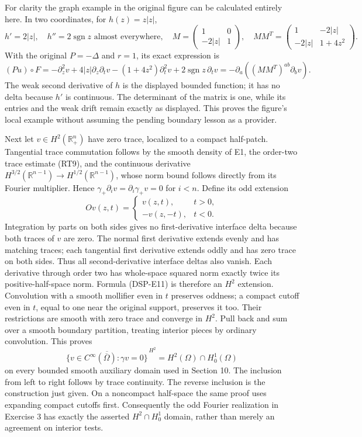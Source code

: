 \documentclass[
  11pt,
]{article}
\begin{document}
For clarity the graph example in the original figure can be calculated
entirely here. In two coordinates, for \(h(z)=z|z|\), \[
 h'=2|z|,\quad h''=2\operatorname{sgn}z\text{ almost everywhere},\quad
 M=\begin{pmatrix}1&0\\-2|z|&1\end{pmatrix},\quad
 MM^T=\begin{pmatrix}1&-2|z|\\-2|z|&1+4z^2\end{pmatrix}.
 \tag{DSP-E9}
\] With the original \(P=-\Delta\) and \(r=1\), its exact expression is
\[
 (Pu)\circ F=-\partial_z^2v+4|z|\partial_z\partial_tv
 -(1+4z^2)\partial_t^2v+2\operatorname{sgn}z\,\partial_tv
 =-\partial_a((MM^T)^{ab}\partial_bv).
 \tag{DSP-E10}
\] The weak second derivative of \(h\) is the displayed bounded
function; it has no delta because \(h'\) is continuous. The determinant
of the matrix is one, while its entries and the weak drift remain
exactly as displayed. This proves the figure's local example without
assuming the pending boundary lesson as a provider.

Next let \(v\in H^2(\mathbb R^n_+)\) have zero trace, localized to a
compact half-patch. Tangential trace commutation follows by the smooth
density of E1, the order-two trace estimate (RT9), and the continuous
derivative \(H^{3/2}(\mathbb R^{n-1})\to H^{1/2}(\mathbb R^{n-1})\),
whose norm bound follows directly from its Fourier multiplier. Hence
\(\gamma_+\partial_iv=\partial_i\gamma_+v=0\) for \(i<n\). Define its
odd extension \[
 Ov(z,t)=\begin{cases}v(z,t),&t>0,\\-v(z,-t),&t<0.\end{cases}
 \tag{DSP-E11}
\] Integration by parts on both sides gives no first-derivative
interface delta because both traces of \(v\) are zero. The normal first
derivative extends evenly and has matching traces; each tangential first
derivative extends oddly and has zero trace on both sides. Thus all
second-derivative interface deltas also vanish. Each derivative through
order two has whole-space squared norm exactly twice its
positive-half-space norm. Formula (DSP-E11) is therefore an \(H^2\)
extension. Convolution with a smooth mollifier even in \(t\) preserves
oddness; a compact cutoff even in \(t\), equal to one near the original
support, preserves it too. Their restrictions are smooth with zero trace
and converge in \(H^2\). Pull back and sum over a smooth boundary
partition, treating interior pieces by ordinary convolution. This proves
\[
 \overline{\{v\in C^\infty(\overline\Omega):\gamma v=0\}}^{\,H^2}
 =H^2(\Omega)\cap H_0^1(\Omega)
 \tag{DSP-E12}
\] on every bounded smooth auxiliary domain used in Section 10. The
inclusion from left to right follows by trace continuity. The reverse
inclusion is the construction just given. On a noncompact half-space the
same proof uses expanding compact cutoffs first. Consequently the odd
Fourier realization in Exercise 3 has exactly the asserted
\(H^2\cap H_0^1\) domain, rather than merely an agreement on interior
tests.
\end{document}
